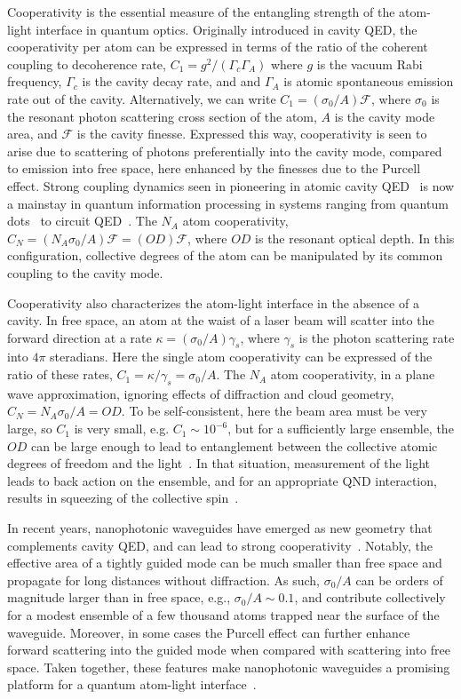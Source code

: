\documentclass[aps,pra,twocolumn,superscriptaddress]{revtex4-1} %
\begin{document}
Cooperativity is the essential measure of the entangling strength of the atom-light interface in quantum optics.  Originally introduced in cavity QED, the cooperativity per atom can be expressed in terms of the ratio of the coherent coupling to decoherence rate, $C_1 = g^2/(\Gamma_c \Gamma_A)$ where $g$ is the vacuum Rabi frequency,  $\Gamma_c$ is the cavity decay rate, and and $\Gamma_A$ is atomic spontaneous emission rate out of the cavity.  Alternatively, we can write $C_1 = (\sigma_0/A) \mathcal{F}$, where $\sigma_0$ is the resonant photon scattering cross section of the atom, $A$ is the cavity mode area, and $\mathcal{F}$ is the cavity finesse.  Expressed this way, cooperativity is seen to arise due to scattering of photons preferentially into the cavity mode, compared to emission into free space, here enhanced by the finesses due to the Purcell effect. Strong coupling dynamics seen in pioneering in atomic cavity QED~\cite{?} is now a mainstay in quantum information processing in systems ranging from quantum dots~\cite{?} to circuit QED~\cite{}.  The $N_A$ atom cooperativity, $C_N = (N_A \sigma_0/A) \mathcal{F} =( OD) \mathcal{F}$, where $OD$ is the resonant optical depth.  In this configuration, collective degrees of the atom can be manipulated by its common coupling to the cavity mode.

Cooperativity also characterizes the atom-light interface in the absence of a cavity.  In free space, an atom at the waist of a laser beam will scatter into the forward direction at a rate $\kappa = (\sigma_0/A) \gamma_s$, where $\gamma_s$ is the photon scattering rate into $4 \pi$ steradians.  Here the single atom cooperativity can be expressed of the ratio of these rates, $C_1 = \kappa/\gamma_s = \sigma_0/A$.  The $N_A$ atom cooperativity, in a plane wave approximation, ignoring effects of diffraction and cloud geometry, $C_N = N_A \sigma_0/A = OD$.  To be self-consistent, here the beam area must be very large, so $C_1$ is very small, e.g. $C_1 \sim 10^{-6}$, but for a sufficiently large ensemble, the $OD$ can be large enough to lead to entanglement between the collective atomic degrees of freedom and the light~\cite{?}.  In that situation, measurement of the light leads to back action on the ensemble, and for an appropriate QND interaction, results in squeezing of the collective spin~\cite{?}.

In recent years, nanophotonic waveguides have emerged as new geometry that complements cavity QED, and can lead to strong cooperativity~\cite{?}.  Notably, the effective area of a tightly guided mode can be much smaller than free space and propagate for long distances without diffraction.  As such,  $\sigma_0/A$ can be orders of magnitude larger than in free space, e.g., $\sigma_0/A \sim 0.1$, and contribute collectively for a modest ensemble of a few thousand atoms trapped near the surface of the waveguide.  Moreover, in some cases the Purcell effect can further enhance forward scattering into the guided mode when compared with scattering into free space.  Taken together, these features make  nanophotonic waveguides a promising platform for a quantum atom-light interface~\cite{?}.
 
\end{document}
